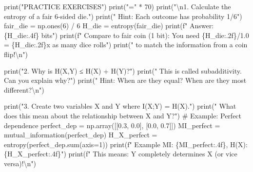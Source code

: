 \documentclass[
  11pt,
  letterpaper,
  oneside,
  openany]{book}
\newenvironment{Shaded}{\begin{snugshade}}{\end{snugshade}}
\newcommand{\BuiltInTok}[1]{\textcolor[rgb]{0.00,0.23,0.31}{#1}}
\newcommand{\CharTok}[1]{\textcolor[rgb]{0.13,0.47,0.30}{#1}}
\newcommand{\CommentTok}[1]{\textcolor[rgb]{0.37,0.37,0.37}{#1}}
\newcommand{\DecValTok}[1]{\textcolor[rgb]{0.68,0.00,0.00}{#1}}
\newcommand{\FloatTok}[1]{\textcolor[rgb]{0.68,0.00,0.00}{#1}}
\newcommand{\NormalTok}[1]{\textcolor[rgb]{0.00,0.23,0.31}{#1}}
\newcommand{\OperatorTok}[1]{\textcolor[rgb]{0.37,0.37,0.37}{#1}}
\newcommand{\SpecialCharTok}[1]{\textcolor[rgb]{0.37,0.37,0.37}{#1}}
\newcommand{\SpecialStringTok}[1]{\textcolor[rgb]{0.13,0.47,0.30}{#1}}
\newcommand{\StringTok}[1]{\textcolor[rgb]{0.13,0.47,0.30}{#1}}
\begin{document}
\begin{Shaded}
\begin{Highlighting}[]
\BuiltInTok{print}\NormalTok{(}\StringTok{"PRACTICE EXERCISES"}\NormalTok{)}
\BuiltInTok{print}\NormalTok{(}\StringTok{"="} \OperatorTok{*} \DecValTok{70}\NormalTok{)}
\BuiltInTok{print}\NormalTok{(}\StringTok{"}\CharTok{\textbackslash{}n}\StringTok{1. Calculate the entropy of a fair 6{-}sided die."}\NormalTok{)}
\BuiltInTok{print}\NormalTok{(}\StringTok{"   Hint: Each outcome has probability 1/6"}\NormalTok{)}
\NormalTok{fair\_die }\OperatorTok{=}\NormalTok{ np.ones(}\DecValTok{6}\NormalTok{) }\OperatorTok{/} \DecValTok{6}
\NormalTok{H\_die }\OperatorTok{=}\NormalTok{ entropy(fair\_die)}
\BuiltInTok{print}\NormalTok{(}\SpecialStringTok{f"   Answer: }\SpecialCharTok{\{}\NormalTok{H\_die}\SpecialCharTok{:.4f\}}\SpecialStringTok{ bits"}\NormalTok{)}
\BuiltInTok{print}\NormalTok{(}\SpecialStringTok{f"   Compare to fair coin (1 bit): You need }\SpecialCharTok{\{}\NormalTok{H\_die}\SpecialCharTok{:.2f\}}\SpecialStringTok{/1.0 = }\SpecialCharTok{\{}\NormalTok{H\_die}\SpecialCharTok{:.2f\}}\SpecialStringTok{x as many dice rolls"}\NormalTok{)}
\BuiltInTok{print}\NormalTok{(}\StringTok{"   to match the information from a coin flip!}\CharTok{\textbackslash{}n}\StringTok{"}\NormalTok{)}

\BuiltInTok{print}\NormalTok{(}\StringTok{"2. Why is H(X,Y) ≤ H(X) + H(Y)?"}\NormalTok{)}
\BuiltInTok{print}\NormalTok{(}\StringTok{"   This is called subadditivity. Can you explain why?"}\NormalTok{)}
\BuiltInTok{print}\NormalTok{(}\StringTok{"   Hint: When are they equal? When are they most different?}\CharTok{\textbackslash{}n}\StringTok{"}\NormalTok{)}

\BuiltInTok{print}\NormalTok{(}\StringTok{"3. Create two variables X and Y where I(X;Y) = H(X)."}\NormalTok{)}
\BuiltInTok{print}\NormalTok{(}\StringTok{"   What does this mean about the relationship between X and Y?"}\NormalTok{)}
\CommentTok{\# Example: Perfect dependence}
\NormalTok{perfect\_dep }\OperatorTok{=}\NormalTok{ np.array([[}\FloatTok{0.3}\NormalTok{, }\FloatTok{0.0}\NormalTok{], [}\FloatTok{0.0}\NormalTok{, }\FloatTok{0.7}\NormalTok{]])}
\NormalTok{MI\_perfect }\OperatorTok{=}\NormalTok{ mutual\_information(perfect\_dep)}
\NormalTok{H\_X\_perfect }\OperatorTok{=}\NormalTok{ entropy(perfect\_dep.}\BuiltInTok{sum}\NormalTok{(axis}\OperatorTok{=}\DecValTok{1}\NormalTok{))}
\BuiltInTok{print}\NormalTok{(}\SpecialStringTok{f"   Example MI: }\SpecialCharTok{\{}\NormalTok{MI\_perfect}\SpecialCharTok{:.4f\}}\SpecialStringTok{, H(X): }\SpecialCharTok{\{}\NormalTok{H\_X\_perfect}\SpecialCharTok{:.4f\}}\SpecialStringTok{"}\NormalTok{)}
\BuiltInTok{print}\NormalTok{(}\SpecialStringTok{f"   This means: Y completely determines X (or vice versa)!}\CharTok{\textbackslash{}n}\SpecialStringTok{"}\NormalTok{)}


\end{Highlighting}
\end{Shaded}
\end{document}
